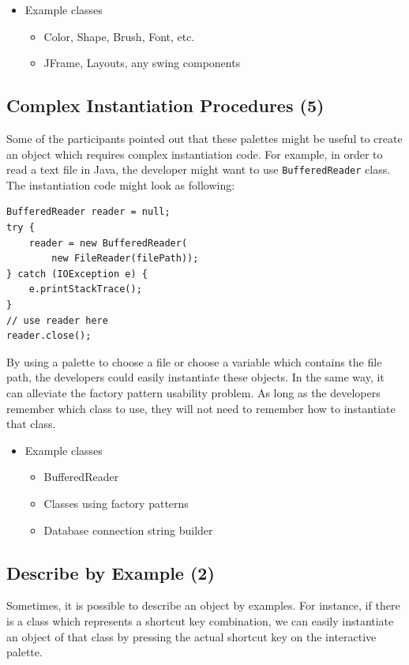 \documentclass[conference]{IEEEtran}
\begin{document}
\begin{itemize}
	\item Example classes
	
	\begin{itemize}
		\item Color, Shape, Brush, Font, etc.
		\item JFrame, Layouts, any swing components
	\end{itemize}
\end{itemize}

\subsection{Complex Instantiation Procedures (5)}
Some of the participants pointed out that these palettes might be useful to create an object which requires complex instantiation code. For example, in order to read a text file in Java, the developer might want to use \texttt{BufferedReader} class. The instantiation code might look as following:
\begin{verbatim}
BufferedReader reader = null;
try {
    reader = new BufferedReader(
        new FileReader(filePath));
} catch (IOException e) {
    e.printStackTrace();
}
// use reader here
reader.close();
\end{verbatim}
By using a palette to choose a file or choose a variable which contains the file path, the developers could easily instantiate these objects. In the same way, it can alleviate the factory pattern usability problem. As long as the developers remember which class to use, they will not need to remember how to instantiate that class.

\begin{itemize}
	\item Example classes
	
	\begin{itemize}
		\item BufferedReader
		\item Classes using factory patterns
		\item Database connection string builder
	\end{itemize}
\end{itemize}

\subsection{Describe by Example (2)}
Sometimes, it is possible to describe an object by examples. For instance, if there is a class which represents a shortcut key combination, we can easily instantiate an object of that class by pressing the actual shortcut key on the interactive palette.
\end{document}
